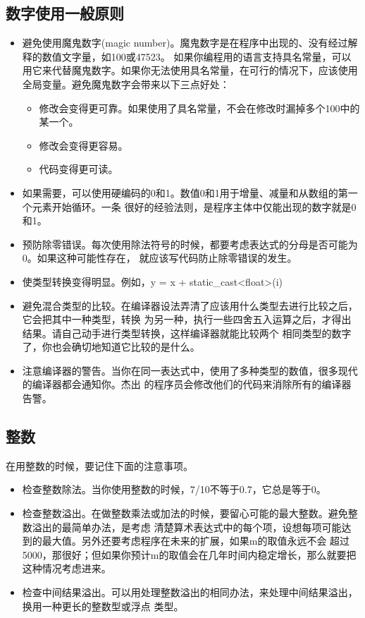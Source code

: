 \documentclass{article}
\begin{document}
\subsection{数字使用一般原则}
\begin{itemize}
    \item 避免使用魔鬼数字(magic number)。魔鬼数字是在程序中出现的、没有经过解释的数值文字量，如100或47523。
    如果你编程用的语言支持具名常量，可以用它来代替魔鬼数字。如果你无法使用具名常量，在可行的情况下，应该使用
    全局变量。避免魔鬼数字会带来以下三点好处：
    \begin{itemize}
        \item 修改会变得更可靠。如果使用了具名常量，不会在修改时漏掉多个100中的某一个。
        \item 修改会变得更容易。
        \item 代码变得更可读。
    \end{itemize}
    \item 如果需要，可以使用硬编码的0和1。数值0和1用于增量、减量和从数组的第一个元素开始循环。一条
    很好的经验法则，是程序主体中仅能出现的数字就是0和1。
    \item 预防除零错误。每次使用除法符号的时候，都要考虑表达式的分母是否可能为0。如果这种可能性存在，
    就应该写代码防止除零错误的发生。
    \item 使类型转换变得明显。例如，y = x + static\_cast<float>(i)
    \item 避免混合类型的比较。在编译器设法弄清了应该用什么类型去进行比较之后，它会把其中一种类型，转换
    为另一种，执行一些四舍五入运算之后，才得出结果。请自己动手进行类型转换，这样编译器就能比较两个
    相同类型的数字了，你也会确切地知道它比较的是什么。
    \item 注意编译器的警告。当你在同一表达式中，使用了多种类型的数值，很多现代的编译器都会通知你。杰出
    的程序员会修改他们的代码来消除所有的编译器告警。
\end{itemize}

\subsection{整数}
在用整数的时候，要记住下面的注意事项。
\begin{itemize}
    \item 检查整数除法。当你使用整数的时候，7/10不等于0.7，它总是等于0。
    \item 检查整数溢出。在做整数乘法或加法的时候，要留心可能的最大整数。避免整数溢出的最简单办法，是考虑
    清楚算术表达式中的每个项，设想每项可能达到的最大值。另外还要考虑程序在未来的扩展，如果m的取值永远不会
    超过5000，那很好；但如果你预计m的取值会在几年时间内稳定增长，那么就要把这种情况考虑进来。
    \item 检查中间结果溢出。可以用处理整数溢出的相同办法，来处理中间结果溢出，换用一种更长的整数型或浮点
    类型。
\end{itemize}
\end{document}
